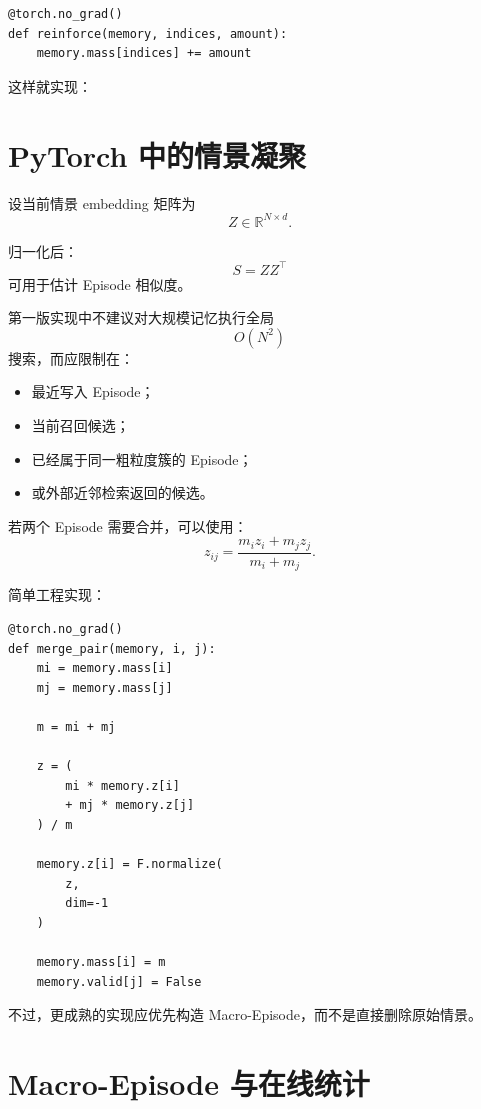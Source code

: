 \begin{verbatim}
@torch.no_grad()
def reinforce(memory, indices, amount):
    memory.mass[indices] += amount
\end{verbatim}

这样就实现：
\begin{statementbox}
\centering
{}
\end{statementbox}

\section{PyTorch 中的情景凝聚}

设当前情景 embedding 矩阵为
\[
Z\in\mathbb R^{N\times d}.
\]

归一化后：
\[
S
=
ZZ^\top
\]
可用于估计 Episode 相似度。

第一版实现中不建议对大规模记忆执行全局
\[
O(N^2)
\]
搜索，而应限制在：

\begin{itemize}
    \item 最近写入 Episode；
    \item 当前召回候选；
    \item 已经属于同一粗粒度簇的 Episode；
    \item 或外部近邻检索返回的候选。
\end{itemize}

若两个 Episode 需要合并，可以使用：
\[
z_{ij}
=
\frac{
m_i z_i+m_j z_j
}{
m_i+m_j
}.
\]

简单工程实现：

\begin{verbatim}
@torch.no_grad()
def merge_pair(memory, i, j):
    mi = memory.mass[i]
    mj = memory.mass[j]

    m = mi + mj

    z = (
        mi * memory.z[i]
        + mj * memory.z[j]
    ) / m

    memory.z[i] = F.normalize(
        z,
        dim=-1
    )

    memory.mass[i] = m
    memory.valid[j] = False
\end{verbatim}

不过，更成熟的实现应优先构造 Macro-Episode，而不是直接删除原始情景。

\section{Macro-Episode 与在线统计}

